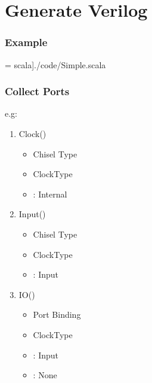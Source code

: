 \section{Generate Verilog}

\begin{frame}
  \frametitle{Example}

   = scala]{./code/Simple.scala }
\end{frame}

\begin{frame}
  \frametitle{Collect Ports}
    
  e.g: \hbox{}

  \begin{enumerate}
    \item Clock() \rightarrow {}
      \begin{itemize}
        \item {} Chisel Type
        \item {} ClockType
        \item {}: Internal
      \end{itemize}
    \item Input() \rightarrow {}
      \begin{itemize}
        \item {} Chisel Type
        \item {} ClockType
        \item {}: Input
      \end{itemize}
    \item IO() \rightarrow {} \rightarrow {}
      \begin{itemize}
        \item {} Port Binding
        \item {} ClockType
        \item {}: Input
        \item {}: None
      \end{itemize}

  \end{enumerate}
\end{frame}

